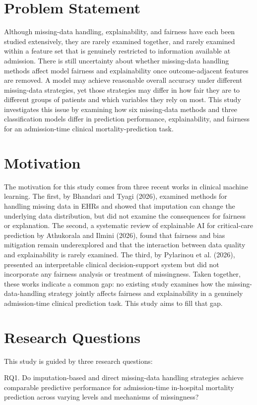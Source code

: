 \documentclass[12pt,a4paper]{report}
\begin{document}
\section{Problem Statement}
Although missing-data handling, explainability, and fairness have each been studied extensively, they are rarely examined together, and rarely examined within a feature set that is genuinely restricted to information available at admission. There is still uncertainty about whether missing-data handling methods affect model fairness and explainability once outcome-adjacent features are removed. A model may achieve reasonable overall accuracy under different missing-data strategies, yet those strategies may differ in how fair they are to different groups of patients and which variables they rely on most. This study investigates this issue by examining how six missing-data methods and three classification models differ in prediction performance, explainability, and fairness for an admission-time clinical mortality-prediction task.

\section{Motivation}
The motivation for this study comes from three recent works in clinical machine learning. The first, by Bhandari and Tyagi (2026), examined methods for handling missing data in EHRs and showed that imputation can change the underlying data distribution, but did not examine the consequences for fairness or explanation. The second, a systematic review of explainable AI for critical-care prediction by Athukorala and Ilmini (2026), found that fairness and bias mitigation remain underexplored and that the interaction between data quality and explainability is rarely examined. The third, by Pylarinou et al. (2026), presented an interpretable clinical decision-support system but did not incorporate any fairness analysis or treatment of missingness. Taken together, these works indicate a common gap: no existing study examines how the missing-data-handling strategy jointly affects fairness and explainability in a genuinely admission-time clinical prediction task. This study aims to fill that gap.


\section{Research Questions}
This study is guided by three research questions:

RQ1. Do imputation-based and direct missing-data handling strategies achieve comparable predictive performance for admission-time in-hospital mortality prediction across varying levels and mechanisms of missingness?
\end{document}
